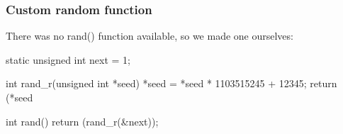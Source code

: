 \subsubsection{Custom random function}

There was no rand() function available, so we made one ourselves:
\\[0.5cm]
\begin{code}

static unsigned int next = 1;

int rand_r(unsigned int *seed) {
    *seed = *seed * 1103515245 + 12345;
    return (*seed %
}

int rand() {
    return (rand_r(&next));
}


\end{code}
